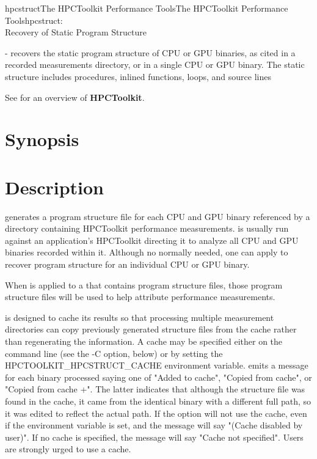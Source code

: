 \documentclass[english]{article}
\begin{document}
\begin{Name}{1}{hpcstruct}{The HPCToolkit Performance Tools}{The HPCToolkit Performance Tools}{hpcstruct:\\ Recovery of Static Program Structure}

 - recovers the static program structure of CPU or GPU binaries, as cited in a recorded measurements directory, or
in a single CPU or GPU binary.
The static structure includes procedures, inlined functions, loops, and source lines

See  for an overview of \textbf{HPCToolkit}.

\end{Name}

\section{Synopsis}

  

  

\section{Description}

 generates a program structure file for each CPU and GPU
binary referenced by a directory containing HPCToolkit performance
measurements.
 is usually run against an application's HPCToolkit  directing
it to analyze all CPU and GPU binaries recorded within it.
Although no normally needed, one can apply  to recover program
structure for an individual CPU or GPU binary.

When  is applied to a  that contains program structure files,
those program structure files will be used to help attribute performance measurements.

 is designed to cache its results so that processing multiple measurement directories
can copy previously generated structure files from the cache rather than regenerating the information.
A cache may be specified either on the command line (see the -C option, below) or
by setting the HPCTOOLKIT_HPCSTRUCT_CACHE environment variable.
 emits a message for each binary processed saying one of "Added to cache",
"Copied from cache", or "Copied from cache +".  The latter indicates that although the structure file was found in the
cache, it came from the identical binary with a different full path, so it was edited to reflect the actual path.
If the  option will not use the cache, even if the environment variable is set, and the message
will say "(Cache disabled by user)".  If no cache is specified, the message will say "Cache not specified".
Users are strongly urged to use a cache.
\end{document}
